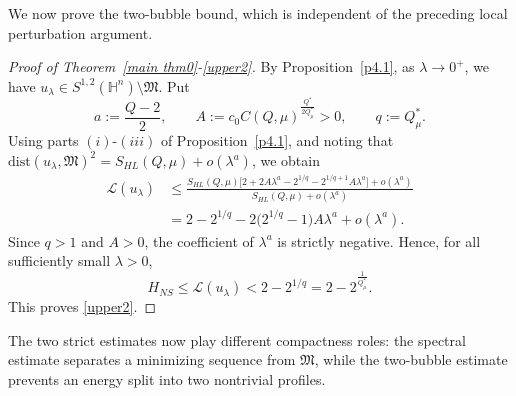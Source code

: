 \documentclass[11pt]{article}
\begin{document}
{We now prove the two-bubble bound, which is independent of the preceding local perturbation argument.}
\begin{proof}
[Proof of Theorem~\ref{main thm0}-\eqref{upper2}]
{By Proposition~\ref{p4.1}, as $\lambda\to0^+$, we have $u_\lambda\in S^{1,2}(\mathbb H^n)\setminus\mathfrak M$. Put
\[
 a:=\frac{Q-2}{2},\qquad
 A:=c_0C(Q,\mu)^{\frac{Q^{\ast}}{2Q^{\ast}_{\mu}}}>0,
 \qquad q:=Q^{\ast}_{\mu}.
\]
Using parts $(i)$-$(iii)$ of Proposition~\ref{p4.1}, and noting that
$\mathrm{dist}(u_\lambda,\mathfrak M)^2=S_{HL}(Q,\mu)+o(\lambda^a)$, we obtain
\begin{align*}
 \mathcal L(u_\lambda)
 &\leq
 \frac{S_{HL}(Q,\mu)\big[2+2A\lambda^a-2^{1/q}-2^{1/q+1}A\lambda^a\big]
       +o(\lambda^a)}{S_{HL}(Q,\mu)+o(\lambda^a)}\\
 &=2-2^{1/q}-2\big(2^{1/q}-1\big)A\lambda^a+o(\lambda^a).
\end{align*}
Since $q>1$ and $A>0$, the coefficient of $\lambda^a$ is strictly negative. Hence, for all sufficiently small $\lambda>0$,
\[
 H_{NS}\leq\mathcal L(u_\lambda)<2-2^{1/q}
 =2-2^{\frac{1}{Q^{\ast}_{\mu}}}.
\]
This proves \eqref{upper2}.}
\end{proof}



The two strict estimates now play different compactness roles: the spectral estimate separates a minimizing sequence from $\mathfrak{M}$, while the two-bubble estimate prevents an energy split into two nontrivial profiles.
\end{document}
